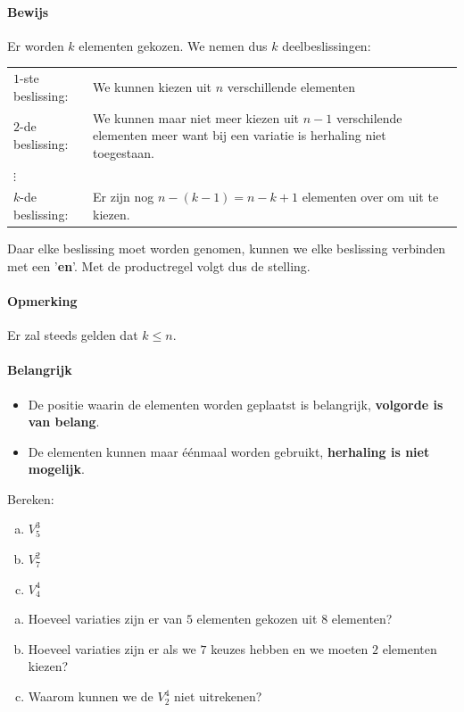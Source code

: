 \documentclass[12pt,a4,twoside]{article}
\begin{document}
\paragraph*{Bewijs}
Er worden $k$ elementen gekozen. We nemen dus $k$ deelbeslissingen:
\begin{center}
\begin{tabular}{lp{12cm}}
$1$-ste beslissing: & We kunnen kiezen uit $n$ verschillende elementen\\
$2$-de beslissing: & We kunnen maar niet meer kiezen uit $n-1$ verschilende elementen meer want bij een variatie is herhaling niet toegestaan.\\
$\vdots$ & \\
$k$-de beslissing: & Er zijn nog $n-(k-1)=n-k+1$ elementen over om uit te kiezen.
\end{tabular}
\end{center}
Daar elke beslissing moet worden genomen, kunnen we elke beslissing verbinden met een '{\bf en}'. Met de productregel volgt dus de stelling.


\paragraph*{Opmerking} Er zal steeds gelden dat $k\leq n$.

\paragraph*{Belangrijk}
\begin{itemize}
  \item De positie waarin de elementen worden geplaatst is belangrijk, {\bf volgorde is van belang}.
  \item De elementen kunnen maar éénmaal worden gebruikt, {\bf herhaling is niet mogelijk}.
\end{itemize}

\begin{oefening}
Bereken:
\begin{multicols}{3}
\begin{enumerate}[(a)]
  \item $V^3_5$
  \item $V^2_7$
  \item $V^4_4$
\end{enumerate}
\end{multicols}
\end{oefening}

\begin{oefening}
\begin{enumerate}[(a)]
  \item Hoeveel variaties zijn er van $5$ elementen gekozen uit $8$ elementen?
  \item Hoeveel variaties zijn er als we $7$ keuzes hebben en we moeten $2$ elementen kiezen?
  \item Waarom kunnen we de $V^4_2$ niet uitrekenen?
  \end{enumerate}
\end{oefening}
\end{document}
